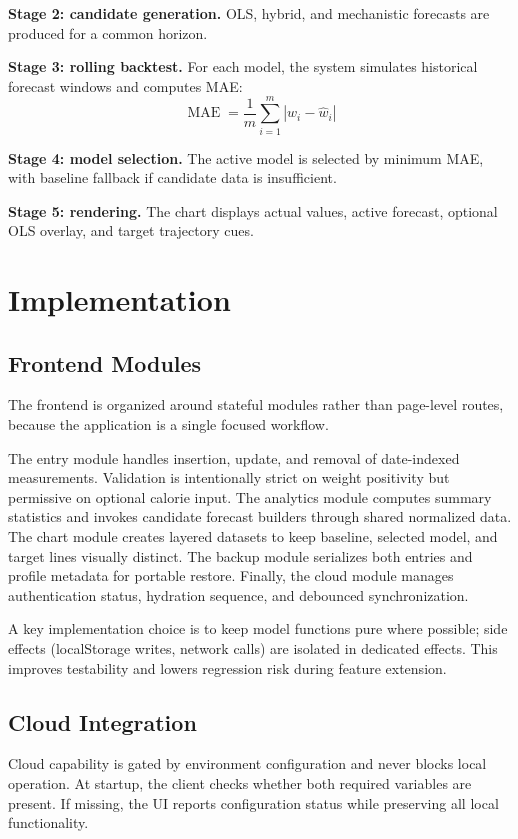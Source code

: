 \documentclass[12pt,a4paper]{report}
\begin{document}
\textbf{Stage 2: candidate generation.} OLS, hybrid, and mechanistic forecasts are produced for a common horizon.

\textbf{Stage 3: rolling backtest.} For each model, the system simulates historical forecast windows and computes MAE:
\[
\operatorname{MAE}=\frac{1}{m}\sum_{i=1}^{m}|w_i-\hat{w}_i|
\]

\textbf{Stage 4: model selection.} The active model is selected by minimum MAE, with baseline fallback if candidate data is insufficient.

\textbf{Stage 5: rendering.} The chart displays actual values, active forecast, optional OLS overlay, and target trajectory cues.

\chapter{Implementation}
\section{Frontend Modules}
The frontend is organized around stateful modules rather than page-level routes, because the application is a single focused workflow.

The entry module handles insertion, update, and removal of date-indexed measurements. Validation is intentionally strict on weight positivity but permissive on optional calorie input. The analytics module computes summary statistics and invokes candidate forecast builders through shared normalized data. The chart module creates layered datasets to keep baseline, selected model, and target lines visually distinct. The backup module serializes both entries and profile metadata for portable restore. Finally, the cloud module manages authentication status, hydration sequence, and debounced synchronization.

A key implementation choice is to keep model functions pure where possible; side effects (localStorage writes, network calls) are isolated in dedicated effects. This improves testability and lowers regression risk during feature extension.

\section{Cloud Integration}
Cloud capability is gated by environment configuration and never blocks local operation. At startup, the client checks whether both required variables are present. If missing, the UI reports configuration status while preserving all local functionality.
\end{document}
